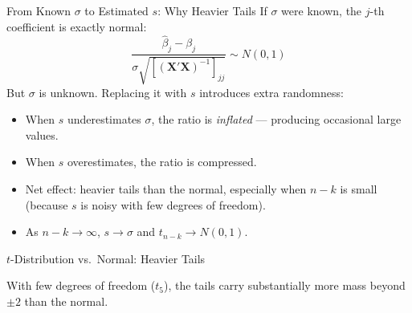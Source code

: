 \documentclass[aspectratio=169, handout, t]{beamer}
\numberwithin{equation}{section}
\begin{document}
\begin{frame}{From Known $\sigma$ to Estimated $s$: Why Heavier Tails}
If $\sigma$ were known, the $j$-th coefficient is exactly normal:
\[
\frac{\hat{\beta}_j - \beta_j}{\sigma\sqrt{[(\bm{X'X})^{-1}]_{jj}}} \sim N(0, 1)
\]\pause
But $\sigma$ is unknown.  Replacing it with $s$ introduces extra randomness:\pause
\begin{itemize}
\item When $s$ underestimates $\sigma$, the ratio is \emph{inflated} --- producing occasional large values.
\item When $s$ overestimates, the ratio is compressed.\pause
\item Net effect: \alert{heavier tails} than the normal, especially when $n{-}k$ is small (because $s$ is noisy with few degrees of freedom).\pause
\item As $n{-}k\to\infty$, $s\to\sigma$ and $t_{n-k}\to N(0,1)$.
\end{itemize}
\end{frame}

\begin{frame}{$t$-Distribution vs.\ Normal: Heavier Tails}
\begin{center}
\end{center}
With few degrees of freedom ($t_5$), the tails carry substantially more mass beyond $\pm 2$ than the normal.
\end{frame}
\end{document}
